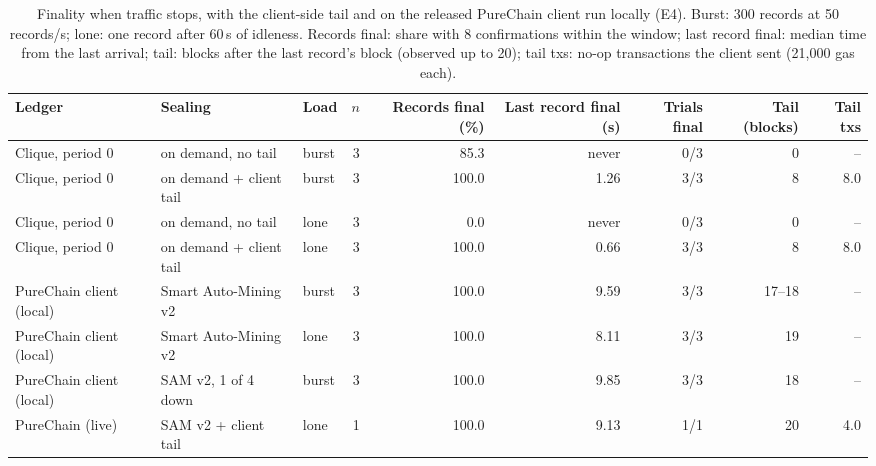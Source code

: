\begin{table}[t]
\centering
\scriptsize
\caption{Finality when traffic stops, with the client-side tail and on the released PureChain client run locally (E4). Burst: 300 records at 50 records/s; lone: one record after 60\,s of idleness. Records final: share with 8 confirmations within the window; last record final: median time from the last arrival; tail: blocks after the last record's block (observed up to 20); tail txs: no-op transactions the client sent (21{,}000 gas each).}
\label{tab:e14}
\begin{adjustbox}{max width=\textwidth}
\begin{tabular}{lllrrrrrr}
\toprule
Ledger & Sealing & Load & $n$ & Records final (\%) & Last record final (s) & Trials final & Tail (blocks) & Tail txs \\
\midrule
Clique, period 0 & on demand, no tail & burst & 3 & 85.3 & never & 0/3 & 0 & -- \\
Clique, period 0 & on demand + client tail & burst & 3 & 100.0 & 1.26 & 3/3 & 8 & 8.0 \\
Clique, period 0 & on demand, no tail & lone & 3 & 0.0 & never & 0/3 & 0 & -- \\
Clique, period 0 & on demand + client tail & lone & 3 & 100.0 & 0.66 & 3/3 & 8 & 8.0 \\
PureChain client (local) & Smart Auto-Mining v2 & burst & 3 & 100.0 & 9.59 & 3/3 & 17--18 & -- \\
PureChain client (local) & Smart Auto-Mining v2 & lone & 3 & 100.0 & 8.11 & 3/3 & 19 & -- \\
PureChain client (local) & SAM v2, 1 of 4 down & burst & 3 & 100.0 & 9.85 & 3/3 & 18 & -- \\
PureChain (live) & SAM v2 + client tail & lone & 1 & 100.0 & 9.13 & 1/1 & 20 & 4.0 \\
\bottomrule
\end{tabular}\end{adjustbox}
\end{table}
